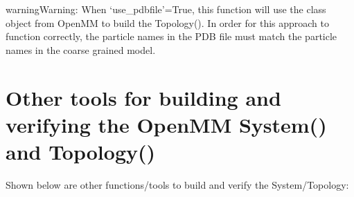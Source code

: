 \documentclass[letterpaper,12pt,english,openany,oneside]{sphinxmanual}
\begin{document}
\begin{fulllineitems}
\begin{sphinxVerbatim}[commandchars=\\\{\}]
   
   
  
  
  
  
\end{sphinxVerbatim}

\begin{sphinxadmonition}{warning}{Warning:}
When ‘use\_pdbfile’=True, this function will use the  class object from OpenMM to build the Topology().  In order for this approach to function correctly, the particle names in the PDB file must match the particle names in the coarse grained model.
\end{sphinxadmonition}

\end{fulllineitems}



\section{Other tools for building and verifying the OpenMM System() and Topology()}
\label{\detokenize{build:other-tools-for-building-and-verifying-the-openmm-system-and-topology}}
Shown below are other functions/tools to build and verify the System/Topology:
\end{document}
